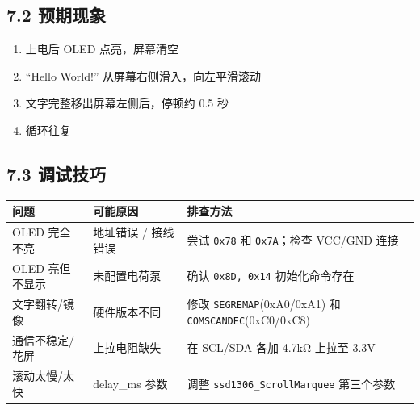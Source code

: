 \documentclass[
  chinese,
  UTF8,
  oneside,
  openany]{ctexbook}
\providecommand{\tightlist}{%
  \setlength{\itemsep}{0pt}\setlength{\parskip}{0pt}}
\begin{document}
\subsection{7.2 预期现象}\label{ux9884ux671fux73b0ux8c61-3}

\begin{enumerate}
\def\labelenumi{\arabic{enumi}.}
\tightlist
\item
  上电后 OLED 点亮，屏幕清空
\item
  ``Hello World!'' 从屏幕右侧滑入，向左平滑滚动
\item
  文字完整移出屏幕左侧后，停顿约 0.5 秒
\item
  循环往复
\end{enumerate}

\subsection{7.3 调试技巧}\label{ux8c03ux8bd5ux6280ux5de7-2}

\begin{longtable}[]{@{}
  >{\raggedright\arraybackslash}p{}
  >{\raggedright\arraybackslash}p{}
  >{\raggedright\arraybackslash}p{}@{}}
\toprule\noalign{}
\begin{minipage}[b]{\linewidth}\raggedright
问题
\end{minipage} & \begin{minipage}[b]{\linewidth}\raggedright
可能原因
\end{minipage} & \begin{minipage}[b]{\linewidth}\raggedright
排查方法
\end{minipage} \\
\midrule\noalign{}
\endhead
\bottomrule\noalign{}
\endlastfoot
OLED 完全不亮 & 地址错误 / 接线错误 & 尝试 \texttt{0x78} 和
\texttt{0x7A}；检查 VCC/GND 连接 \\
OLED 亮但不显示 & 未配置电荷泵 & 确认 \texttt{0x8D,\ 0x14}
初始化命令存在 \\
文字翻转/镜像 & 硬件版本不同 & 修改 \texttt{SEGREMAP}(0xA0/0xA1) 和
\texttt{COMSCANDEC}(0xC0/0xC8) \\
通信不稳定/花屏 & 上拉电阻缺失 & 在 SCL/SDA 各加 4.7kΩ 上拉至 3.3V \\
滚动太慢/太快 & delay\_ms 参数 & 调整 \texttt{ssd1306\_ScrollMarquee}
第三个参数 \\
\end{longtable}
\end{document}
